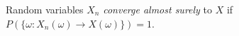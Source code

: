 
Random variables $X_n$ \emph{converge almost surely} to $X$ if $P(\{\omega:X_n(\omega)\to X(\omega)\})=1$.
